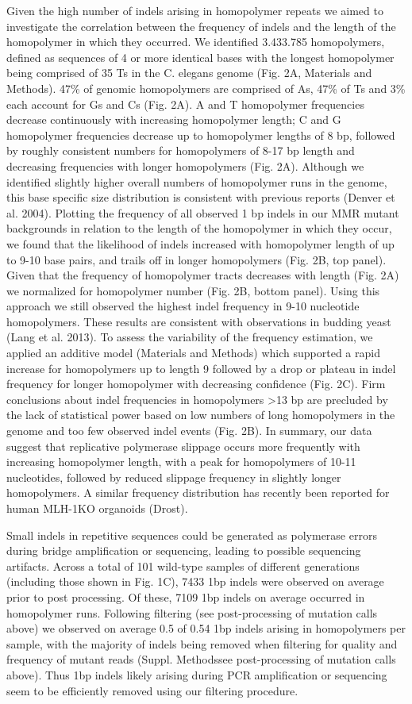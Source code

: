 Given the high number of indels arising in homopolymer repeats we aimed to investigate the correlation between the frequency of indels and the length of the homopolymer in which they occurred. We identified 3.433.785 homopolymers, defined as sequences of 4 or more identical bases with the longest homopolymer being comprised of 35 Ts in the C. elegans genome (Fig. 2A, Materials and Methods). 47\% of genomic homopolymers are comprised of As, 47\% of Ts and 3\% each account for Gs and Cs (Fig. 2A). A and T homopolymer frequencies decrease continuously with increasing homopolymer length; C and G homopolymer frequencies decrease up to homopolymer lengths of 8 bp, followed by roughly consistent numbers for homopolymers of 8-17 bp length and decreasing frequencies with longer homopolymers (Fig. 2A). Although we identified slightly higher overall numbers of homopolymer runs in the genome, this base specific size distribution is consistent with previous reports (Denver et al. 2004). Plotting the frequency of all observed 1 bp indels in our MMR mutant backgrounds in relation to the length of the homopolymer in which they occur, we found that the likelihood of indels increased with homopolymer length of up to 9-10 base pairs, and trails off in longer homopolymers (Fig. 2B, top panel). Given that the frequency of homopolymer tracts decreases with length (Fig. 2A) we normalized for homopolymer number (Fig. 2B, bottom panel). Using this approach we still observed the highest indel frequency in 9-10 nucleotide homopolymers. These results are consistent with observations in budding yeast (Lang et al. 2013). To assess the variability of the frequency estimation, we applied an additive model (Materials and Methods) which supported a rapid increase for homopolymers up to length 9 followed by a drop or plateau in indel frequency for longer homopolymer with decreasing confidence (Fig. 2C). Firm conclusions about indel frequencies in homopolymers >13 bp are precluded by the lack of statistical power based on low numbers of long homopolymers in the genome and too few observed indel events (Fig. 2B). In summary, our data suggest that replicative polymerase slippage occurs more frequently with increasing homopolymer length, with a peak for homopolymers of 10-11 nucleotides, followed by reduced slippage frequency in slightly longer homopolymers. A similar frequency distribution has recently been reported for human MLH-1KO organoids (Drost).

Small indels in repetitive sequences could be generated as polymerase errors during bridge amplification or sequencing, leading to possible sequencing artifacts. Across a total of 101 wild-type samples of different generations (including those shown in Fig. 1C), 7433 1bp indels were observed on average prior to post processing. Of these, 7109 1bp indels on average occurred in homopolymer runs. Following filtering (see post-processing of mutation calls above) we observed on average 0.5 of 0.54 1bp indels arising in homopolymers per sample, with the majority of indels being removed when filtering for quality and frequency of mutant reads (Suppl. Methodssee post-processing of mutation calls above). Thus 1bp indels likely arising during PCR amplification or sequencing seem to be efficiently removed using our filtering procedure. 

